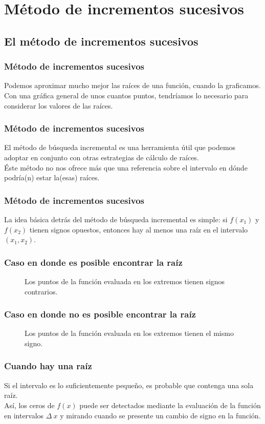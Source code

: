 \documentclass[12pt]{beamer}
\begin{document}
\section{Método de incrementos sucesivos}
\subsection{El método de incrementos sucesivos}

\begin{frame}
\frametitle{Método de incrementos sucesivos}
Podemos aproximar mucho mejor las raíces de una función, cuando la graficamos.
\\
\bigskip
\pause
Con una gráfica general de unos cuantos puntos, tendríamos lo necesario para considerar los valores de las raíces.
\end{frame}
\begin{frame}
\frametitle{Método de incrementos sucesivos}
El método de \textcolor{blue-violet}{búsqueda incremental} es una herramienta útil que podemos adoptar en conjunto con otras estrategias de cálculo de raíces.
\\
\bigskip
\pause
Éste método no nos ofrece más que una referencia sobre el intervalo en dónde podría(n) estar la(esas) raíces.
\end{frame}
\begin{frame}
\frametitle{Método de incrementos sucesivos}
La idea básica detrás del método de búsqueda incremental es simple: si $f(x_{1})$ y $f(x_{2})$ tienen signos opuestos, entonces hay al menos una raíz en el intervalo $(x_{1}, x_{2})$.
\end{frame}
\begin{frame}[fragile]
\frametitle{Caso en donde es posible encontrar la raíz}
\begin{figure}
	\centering
	
	\caption{Los puntos de la función evaluada en los extremos tienen signos contrarios.}
\end{figure}
\end{frame}
\begin{frame}[fragile]
\frametitle{Caso en donde no es posible encontrar la raíz}
\begin{figure}
	\centering
	
	\caption{Los puntos de la función evaluada en los extremos tienen el mismo signo.}
\end{figure}
\end{frame}
\begin{frame}
\frametitle{Cuando hay una raíz}
Si el intervalo es lo suficientemente pequeño, es probable que contenga una sola raíz.
\\
\bigskip
\pause
Así, los ceros de $f (x)$ puede ser detectados mediante la evaluación de la función en  intervalos $\Delta \: x$ y mirando cuando se presente un cambio de signo en la función.
\end{frame}
\end{document}
